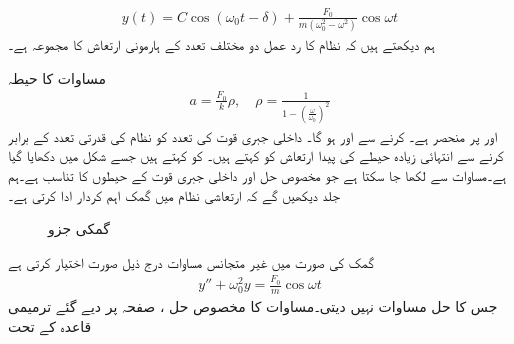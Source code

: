 \begin{align}\label{مساوات_سادہ_دو_بلا_تقصیر_حل_ب}
y(t)=C\cos(\omega_0 t-\delta)+\frac{F_0}{m(\omega_0^2-\omega^2)}\cos \omega t
\end{align}
ہم دیکھتے ہیں کہ نظام کا رد عمل دو مختلف تعدد کے ہارمونی ارتعاش کا مجموعہ ہے۔

مساوات  کا حیطہ
\begin{align}\label{مساوات_سادہ_دو_بلا_تقصیر_حل_پ}
a=\frac{F_0}{k} \rho, \quad \rho=\frac{1}{1-\left(\frac{\omega}{\omega_0}\right)^2}
\end{align}
 اور  پر منحصر ہے۔  کرنے سے  اور  ہو گا۔ داخلی جبری قوت کی تعدد کو نظام کی قدرتی تعدد کے برابر  کرنے سے انتہائی زیادہ حیطے کی پیدا ارتعاش  کو  کہتے ہیں۔  کو  کہتے ہیں جسے شکل  میں دکھایا گیا ہے۔مساوات  سے  لکھا جا سکتا ہے جو مخصوص حل  اور داخلی جبری قوت کے حیطوں کا تناسب ہے۔ہم جلد دیکھیں گے کہ ارتعاشی نظام میں گمک اہم کردار ادا کرتی ہے۔
\begin{figure}
\centering
{}
\caption{گمکی جزو }
\label{شکل_سادہ_دو_گمکی_جزو_بالمقابل_تعدد}
\end{figure}
گمک کی صورت میں غیر متجانس مساوات  درج ذیل صورت اختیار کرتی ہے
 \begin{align}\label{مساوات_سادہ_دو_بلا_تقصیر_حل_ت}
y''+\omega_0^2 y=\frac{F_0}{m} \cos \omega t
\end{align} 
جس کا حل مساوات  نہیں دیتی۔مساوات  کا مخصوص حل ،  صفحہ  پر دیے گئے ترمیمی قاعدہ کے تحت

